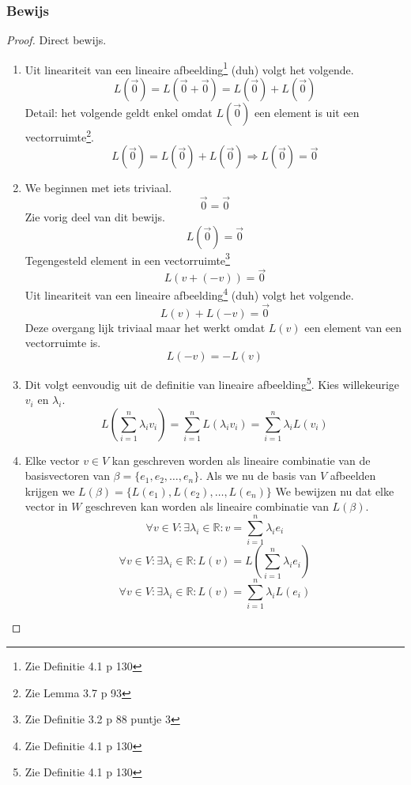 \documentclass[lineaire_algebra_oplossingen.tex]{subfiles}
\begin{document}
\subsubsection*{Bewijs}
\begin{proof}
Direct bewijs.
\begin{enumerate}
\item
Uit lineariteit van een lineaire afbeelding\footnote{Zie Definitie 4.1 p 130} (duh) volgt het volgende.
\[
L(\vec{0}) = L(\vec{0} + \vec{0}) = L(\vec{0}) + L(\vec{0})
\]
Detail: het volgende geldt enkel omdat $L(\vec{0})$ een element is uit een vectorruimte\footnote{Zie Lemma 3.7 p 93}.
\[
L(\vec{0}) = L(\vec{0}) + L(\vec{0}) \Rightarrow L(\vec{0}) = \vec{0}
\]
\item
We beginnen met iets triviaal.
\[\vec{0}=\vec{0}\]
Zie vorig deel van dit bewijs.
\[L(\vec{0}) = \vec{0}\]
Tegengesteld element in een vectorruimte\footnote{Zie Definitie 3.2 p 88 puntje 3}
\[L(v + (-v)) = \vec{0}\]
Uit lineariteit van een lineaire afbeelding\footnote{Zie Definitie 4.1 p 130} (duh) volgt het volgende.
\[L(v) + L(-v) = \vec{0}\]
Deze overgang lijk triviaal maar het werkt omdat $L(v)$ een element van een vectorruimte is.
\[L(-v) = - L(v)\]
\item
Dit volgt eenvoudig uit de definitie van lineaire afbeelding\footnote{Zie Definitie 4.1 p 130}. Kies willekeurige $v_i$ en $\lambda_i$.
\[L\left(\sum_{i=1}^n\lambda_iv_i\right) =  \sum_{i=1}^nL(\lambda_iv_i)= \sum_{i=1}^n\lambda_iL(v_i)\]
\item
Elke vector $v\in V$ kan geschreven worden als lineaire combinatie van de basisvectoren van $\beta = \{e_1,e_2,\ldots,e_n\}$. Als we nu de basis van $V$ afbeelden krijgen we $L(\beta) = \{L(e_1),L(e_2),\ldots,L(e_n)\}$ We bewijzen nu dat elke vector in $W$ geschreven kan worden als lineaire combinatie van $L(\beta)$.
\[
\forall v \in V:\exists\lambda_i \in \mathbb{R}: v= \sum_{i=1}^n\lambda_ie_i
\]
\[
\forall v \in V:\exists\lambda_i \in \mathbb{R}: L(v)= L(\sum_{i=1}^n\lambda_ie_i)
\]
\[
\forall v \in V:\exists\lambda_i \in \mathbb{R}: L(v)= \sum_{i=1}^n\lambda_iL(e_i)
\]
\end{enumerate}
\end{proof}
\end{document}
